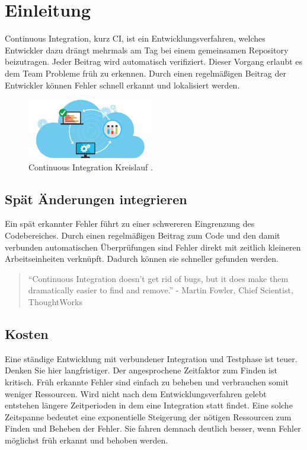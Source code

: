 \chapter{Einleitung}
Continuous Integration, kurz CI, ist ein Entwicklungsverfahren, welches Entwickler dazu drängt mehrmals am Tag bei einem gemeinsamen Repository beizutragen. Jeder Beitrag wird automatisch verifiziert. Dieser Vorgang erlaubt es dem Team Probleme früh zu erkennen.
Durch einen regelmäßigen Beitrag der Entwickler können Fehler schnell erkannt und lokalisiert werden.

\begin{figure}[!htb]
	\centerline{\includegraphics[width=0.5\textwidth]{img/ci}}
	\caption{Continuous Integration Kreislauf \cite{continuous-integration-circle}.}
	\label{ci}
\end{figure}

\section{Spät Änderungen integrieren}
Ein spät erkannter Fehler führt zu einer schwereren Eingrenzung des Codebereiches. Durch einen regelmäßigen Beitrag zum Code und den damit verbunden automatischen Überprüfungen sind Fehler direkt mit zeitlich kleineren Arbeitseinheiten verknüpft. Dadurch können sie schneller gefunden werden.

\begin{quote}
“Continuous Integration doesn’t get rid of bugs, but it does make them dramatically easier to find and remove.” - Martin Fowler, Chief Scientist, ThoughtWorks \cite{continuous-integration-thoughtworks}
\end{quote}

\section{Kosten}
Eine ständige Entwicklung mit verbundener Integration und Testphase ist teuer. Denken Sie hier langfristiger. Der angesprochene Zeitfaktor zum Finden ist kritisch. Früh erkannte Fehler sind einfach zu beheben und verbrauchen somit weniger Ressourcen. Wird nicht nach dem Entwicklungsverfahren gelebt entstehen längere Zeitperioden in dem eine Integration statt findet. Eine solche Zeitspanne bedeutet eine exponentielle Steigerung der nötigen Ressourcen zum Finden und Beheben der Fehler. Sie fahren demnach deutlich besser, wenn Fehler möglichst früh erkannt und behoben werden.

